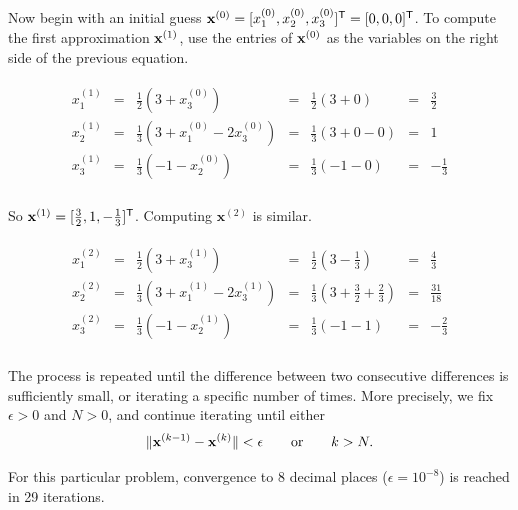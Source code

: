 Now begin with an initial guess $\mathbf{x}^{(0)} = [x^{(0)}_1, x^{(0)}_2, x^{(0)}_3]^{\mathsf T} = [0,0,0]^{\mathsf T}$.
To compute the first approximation $\mathbf{x}^{(1)}$, use the entries of $\mathbf{x}^{(0)}$ as the variables on the right side of the previous equation.

\begin{align*}
\begin{array}{ccccccc}
    x^{(1)}_1 & = & \frac{1}{2}(3 + x^{(0)}_3) & = & \frac{1}{2} (3 + 0) & = & \frac{3}{2} \\
    x^{(1)}_2 & = & \frac{1}{3}(3 + x^{(0)}_1 - 2x^{(0)}_3) & = & \frac{1}{3} (3 + 0 - 0) & = & 1 \\
    x^{(1)}_3 & = & \frac{1}{3}(-1 - x^{(0)}_2) & = & \frac{1}{3} (-1 - 0) & = & -\frac{1}{3} \\
\end{array}
\end{align*}

So $\mathbf{x}^{(1)} = [\frac{3}{2}, 1, -\frac{1}{3}]^{\mathsf T}$.
Computing $\mathbf{x}^{(2)}$ is similar.

\begin{align*}
\begin{array}{ccccccc}
x^{(2)}_1 & = & \frac{1}{2} ( 3 + x^{(1)}_3)  & = & \frac{1}{2} (3 - \frac{1}{3})     & = & \frac{4}{3} \\
x^{(2)}_2 & = & \frac{1}{3} ( 3 + x^{(1)}_1 - 2x^{(1)}_3) & = & \frac{1}{3} (3 + \frac{3}{2} + \frac{2}{3}) & = &  \frac{31}{18} \\
x^{(2)}_3 & = & \frac{1}{3} ( -1 - x^{(1)}_2)       & = & \frac{1}{3} (-1 - 1)    & = & -\frac{2}{3} \\
\end{array}
\end{align*}

The process is repeated until the difference between two consecutive differences is sufficiently small, or iterating a specific number of times.
More precisely, we fix $\epsilon > 0$ and $N > 0$, and continue iterating until either \[\|\mathbf{x}^{(k-1)} - \mathbf{x}^{(k)}\| < \epsilon\qquad\text{or}\qquad k > N.\]

For this particular problem, convergence to 8 decimal places ($\epsilon = 10^{-8}$) is reached in 29 iterations.

